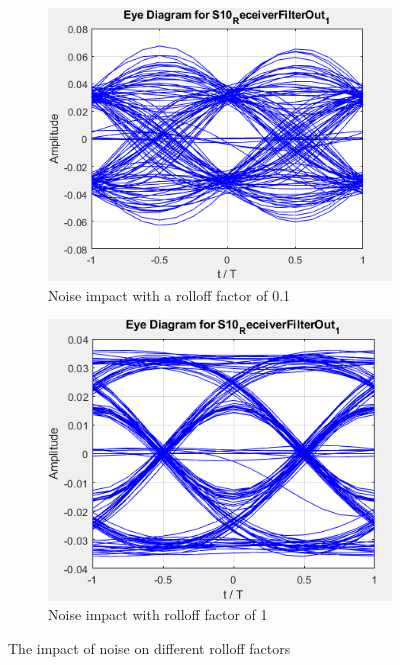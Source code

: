 \begin{figure}[H]
	\centering
	\begin{subfigure}{.4\textwidth}
		\centering
		\includegraphics[scale=0.55]{./lib/m_qam_transmitter/figures/eye_noise_rolloff01.png}	
		\caption{Noise impact with a rolloff factor of 0.1}
		\label{fig:noise_roll01}
	\end{subfigure}
	\begin{subfigure}{.4\textwidth}
		\centering
		\includegraphics[scale=0.6]{./lib/m_qam_transmitter/figures/eye_noise_rolloff1.png}
		\caption{Noise impact with rolloff factor of 1}
		\label{fig:noise_roll1}	
	\end{subfigure}
\caption{The impact of noise on different rolloff factors}
\label{fig:noise_roll}	
\end{figure}
